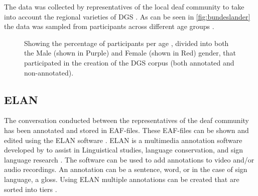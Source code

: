  The data was collected by representatives of the local deaf community to take into account the regional varieties of DGS \cite{deaf_areas}. As can be seen in \autoref{fig:bundeslander} the data was sampled from participants across different age groups \cite{age_data_hamburg}. 


\mydata

\begin{figure}[h]
\caption{Showing the percentage of participants per age , divided into both the Male (shown in Purple) and Female (shown in Red) gender,  that participated in the creation of the DGS corpus (both annotated and non-annotated). \cite{age_data_hamburg}}

\label{fig:bundeslander}
\end{figure}

\subsection{ELAN}
The conversation conducted between the representatives of the deaf community has been annotated and stored in EAF-files. These EAF-files can be shown and edited using the ELAN software \cite{crasborn2008enhanced}. ELAN is a multimedia annotation software developed by \citep{elan_software} to assist in Linguistical studies, language conservation, and sign language research \cite{brugman2004annotating}. The software can be used to add annotations to video and/or audio recordings. An annotation can be a sentence, word, or in the case of sign language, a gloss. Using ELAN multiple annotations can be created that are sorted into tiers \cite{crasborn2008enhanced}.  

